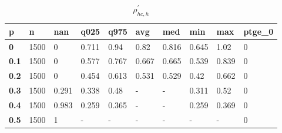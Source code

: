 \begin{table}[h]
 \centering 
\footnotesize
\caption{$\rho_{hc,h}^\prime $}
\label{tab:alphahch}
\begin{tabular}[h]{|l|l|l|l|l|l|l|l|l|l|
    } \hline
\textbf{ p} & \textbf{ n} & \textbf{ nan} & \textbf{ q025} & \textbf{ q975} & \textbf{ avg} & \textbf{ med} & \textbf{ min} & \textbf{ max} & \textbf{ ptge\_0}
    \\ \hline
  \textbf{  0} & 1500 &     0 & 0.711 &  0.94 &  0.82 & 0.816 & 0.645 &  1.02 & 0
    \\ \hline
  \textbf{0.1} & 1500 &     0 & 0.577 & 0.767 & 0.667 & 0.665 & 0.539 & 0.839 & 0
    \\ \hline
  \textbf{0.2} & 1500 &     0 & 0.454 & 0.613 & 0.531 & 0.529 &  0.42 & 0.662 & 0
    \\ \hline
  \textbf{0.3} & 1500 & 0.291 & 0.338 &  0.48 & - & - & 0.311 &  0.52 & 0
    \\ \hline
  \textbf{0.4} & 1500 & 0.983 & 0.259 & 0.365 & - & - & 0.259 & 0.369 & 0
    \\ \hline
  \textbf{0.5} & 1500 &     1 & - & - & - & - & - & - & 0
    \\ \hline
 \end{tabular}
 \end{table}
